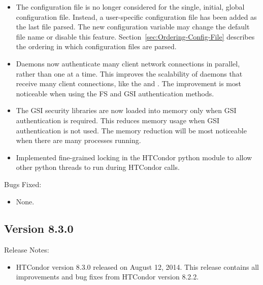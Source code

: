 \begin{itemize}
\item The configuration file 
is no longer considered for the single, initial, global configuration file.
Instead, a user-specific configuration file has been added as the
last file parsed.
The new configuration variable  may change the
default file name or disable this feature.
Section~\ref{sec:Ordering-Config-File} describes the ordering
in which configuration files are parsed.

\item Daemons now authenticate many client network connections in
parallel, rather than one at a time.
This improves the scalability of daemons that receive many client
connections, like the  and .
The improvement is most noticeable when using the FS and GSI
authentication methods.

\item The GSI security libraries are now loaded into memory only when GSI
authentication is required.
This reduces memory usage when GSI authentication is not used.
The memory reduction will be most noticeable when there are many
 processes running.

\item Implemented fine-grained locking in the HTCondor python module to
allow other python threads to run during HTCondor calls.

\end{itemize}

\noindent Bugs Fixed:

\begin{itemize}

\item None.

\end{itemize}

\subsection*{\label{sec:New-8-3-0}Version 8.3.0}

\noindent Release Notes:

\begin{itemize}

\item HTCondor version 8.3.0 released on August 12, 2014.
This release contains all improvements and bug fixes from 
HTCondor version 8.2.2.

\end{itemize}


